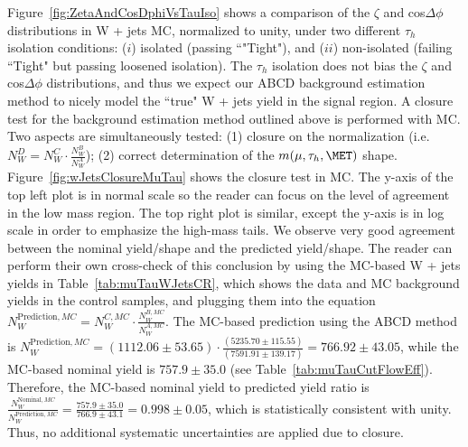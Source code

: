 Figure~\ref{fig:ZetaAndCosDphiVsTauIso} shows a comparison of the $\zeta$ and cos$\Delta\phi$ distributions in W + jets MC, normalized to unity, under two 
different $\tau_{h}$ isolation conditions: ($i$) isolated (passing ``"Tight"), and ($ii$) non-isolated (failing ``Tight" but passing loosened isolation). The 
$\tau_{h}$ isolation does not bias the $\zeta$ and cos$\Delta\phi$ distributions, and thus we expect our ABCD background estimation method to nicely model the ``true" W + 
jets yield in the signal region. A closure test for the background estimation method outlined above is performed with MC. Two aspects are simultaneously tested: 
(1) closure on the normalization (i.e. $N_{W}^{D} = N_{W}^{C} \cdot \frac{N_{W}^{B}}{N_{W}^{A}}$); (2) correct determination of the $m(\mu,\tau_{h},\MET)$ shape. 
Figure~\ref{fig:wJetsClosureMuTau} shows the closure test in MC. The y-axis of the top left plot is in normal scale so the reader can focus on the level of 
agreement in the low mass region. The top right plot is similar, except the y-axis is in log scale in order to emphasize the high-mass tails. We observe very 
good agreement between the nominal yield/shape and the predicted yield/shape. The reader can perform their own cross-check of this conclusion by using the 
MC-based W + jets yields in Table~\ref{tab:muTauWJetsCR}, which shows the data and MC background yields in the control samples, and plugging them into the 
equation $N_{W}^{\textrm{Prediction},MC} = N_{W}^{C,MC} \cdot \frac{N_{W}^{B,MC}}{N_{W}^{A,MC}}$. The MC-based prediction using the ABCD method is 
$N_{W}^{\textrm{Prediction},MC} = (1112.06 \pm 53.65) \cdot \frac{(5235.70 \pm 115.55)}{(7591.91 \pm 139.17)} = 766.92 \pm 43.05$, while the MC-based nominal 
yield is $757.9 \pm 35.0$ (see Table~\ref{tab:muTauCutFlowEff}). Therefore, the MC-based nominal yield to predicted yield ratio is 
$\frac{N_{W}^{\textrm{Nominal},MC}}{N_{W}^{\textrm{Prediction},MC}} = \frac{757.9 \pm 35.0}{766.9 \pm 43.1} = 0.998 \pm 0.05$, which is statistically 
consistent with unity. 
Thus, no additional systematic uncertainties are applied due to closure.

